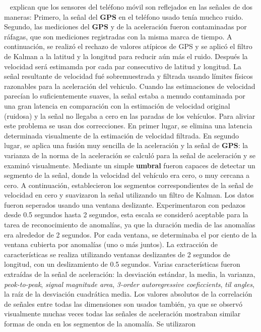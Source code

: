 		~ explican que los sensores del teléfono móvil son reflejados en las señales de dos maneras: Primero, la
		señal del \textbf{GPS} en el teléfono usado tenía muchco ruido. Segundo, las mediciones del \textbf{GPS} y de la aceleración fueron contaminadas
		por ráfagas, que son mediciones registradas con la misma marca de tiempo. A continuación, se realizó el rechazo de valores atípicos de GPS y se
		aplicó el filtro de Kalman a la latitud y la longitud para reducir aún más el ruido. Después la velocidad será estimamda por cada par consecutivo
		de latitud y longitud. La señal resultante de velocidad fué sobremuestrada y filtrada usando límites físicos razonables para la aceleración del
		vehiculo. Cuando las estimaciones de velocidad parecían lo suficientemente suaves, la señal estaba a menudo contaminada por una gran latencia en
		comparación con la estimación de velocidad original (ruidosa) y la señal no llegaba a cero en las paradas de los vehículos. Para aliviar este
		problema se usan dos correcciones. En primer lugar, se elimina una latencia determinada visualmente de la estimación de velocidad filtrada. En
		segundo lugar, se aplica una fusión muy sencilla de la aceleración y la señal de \textbf{GPS}: la varianza de la norma de la aceleración se
		calculó para la señal de aceleración y se examinó visualmente. Mediante un simple \textbf{umbral} fueron capaces de detectar un segmento de
		la señal, donde la velocidad del vehículo era cero, o muy cercana a cero. A continuación, establecieron los segmentos correspondientes de la
		señal de velocidad en cero y suavizaron la señal utilizando un filtro de Kalman. Los datos fueron seperados usando una ventana deslizante.
		Experimentaron con pedazos desde 0.5 segundos hasta 2 segundos, esta escala se consideró aceptable para la tarea de reconocimiento de anomalías,
		ya que la duración media de las anomalías era alrededor de 2 segundos. Por cada ventana, se determinaba el por ciento de la ventana cubierta
		por anomalías (uno o más juntos). La extracción de características se realiza utilizando ventanas deslizantes de 2 segundos de longitud, con un
		deslizamiento de 0.5 segundos. Varias características fueron extraídas de la señal de aceleración: la desviación estándar, la media, la varianza,
		\emph{peok-to-peak}, \emph{signal magnitude area}, \emph{3-order autoregressive coeficcients}, \emph{til angles}, la raíz de la desviación
		cuadrática media. Los valores absolutos de la correlación de señales entre todas las dimensiones son usados también, ya que se observó
		visualmente muchas veces todas las señales de aceleración mostraban similar formas de onda en los segmentos de la anomalía. Se utilizaron
